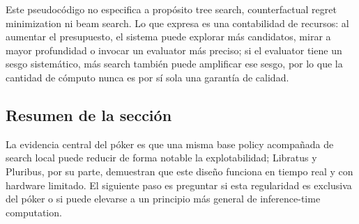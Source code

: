 Este pseudocódigo no especifica a propósito tree search, counterfactual regret minimization ni beam search. Lo que expresa es una contabilidad de recursos: al aumentar el presupuesto, el sistema puede explorar más candidatos, mirar a mayor profundidad o invocar un evaluator más preciso; si el evaluator tiene un sesgo sistemático, más search también puede amplificar ese sesgo, por lo que la cantidad de cómputo nunca es por sí sola una garantía de calidad.

\subsection{Resumen de la sección}

La evidencia central del póker es que una misma base policy acompañada de search local puede reducir de forma notable la explotabilidad; Libratus y Pluribus, por su parte, demuestran que este diseño funciona en tiempo real y con hardware limitado. El siguiente paso es preguntar si esta regularidad es exclusiva del póker o si puede elevarse a un principio más general de inference-time computation.
